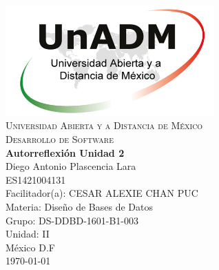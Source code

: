 \documentclass[spanish,12pt,letterpapper]{article}
\begin{document}
	\begin{titlepage}
		\begin{center}
			\includegraphics[width=0.6\textwidth]{../logoUnADM}~\\[1cm] 
			\textsc{Universidad Abierta y a Distancia de México}\\[0.8cm]
			\textsc{Desarrollo de Software}\\[1.8cm]
			
			\textbf{ \Large Autorreflexión Unidad 2}\\[3cm]
			
			Diego Antonio Plascencia Lara\\ ES1421004131 \\[0.4cm]
			Facilitador(a): CESAR ALEXIE CHAN PUC  \\
			Materia: Diseño de Bases de Datos\\
			Grupo: DS-DDBD-1601-B1-003 \\
			Unidad: II \\
			
			\vfill México D.F\\{\today}
			
		\end{center}
	\end{titlepage}
	
\end{document}
